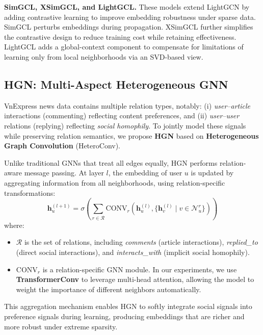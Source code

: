 \documentclass[11pt]{article}
\begin{document}
\textbf{SimGCL, XSimGCL, and LightGCL.}
These models extend LightGCN by adding contrastive learning
to improve embedding robustness under sparse data.
SimGCL perturbs embeddings during propagation.
XSimGCL further simplifies the contrastive design to reduce training cost
while retaining effectiveness.
LightGCL adds a global-context component
to compensate for limitations of learning only from local neighborhoods via an SVD-based view.

\subsection{HGN: Multi-Aspect Heterogeneous GNN}
VnExpress news data contains multiple relation types, notably:
(i) \textit{user--article} interactions (commenting) reflecting content preferences, and
(ii) \textit{user--user} relations (replying) reflecting \textit{social homophily}.
To jointly model these signals while preserving relation semantics, we propose \textbf{HGN} based on \textbf{Heterogeneous Graph Convolution} (HeteroConv).

Unlike traditional GNNs that treat all edges equally, HGN performs relation-aware message passing.
At layer $l$, the embedding of user $u$ is updated by aggregating information from all neighborhoods, using relation-specific transformations:
\begin{equation}
    \mathbf{h}_u^{(l+1)} = \sigma \left( \sum_{r \in \mathcal{R}} \text{CONV}_r \left( \mathbf{h}_u^{(l)}, \{ \mathbf{h}_v^{(l)} \mid v \in \mathcal{N}_u^r \} \right) \right)
    \label{eq:hetero_agg}
\end{equation}
where:
\begin{itemize}
    \item $\mathcal{R}$ is the set of relations, including \textit{comments} (article interactions), \textit{replied\_to} (direct social interactions), and \textit{interacts\_with} (implicit social homophily).
    \item $\text{CONV}_r$ is a relation-specific GNN module. In our experiments, we use \textbf{TransformerConv} to leverage multi-head attention, allowing the model to weight the importance of different neighbors automatically.
\end{itemize}
This aggregation mechanism enables HGN to softly integrate social signals into preference signals during learning, producing embeddings that are richer and more robust under extreme sparsity.
\end{document}
